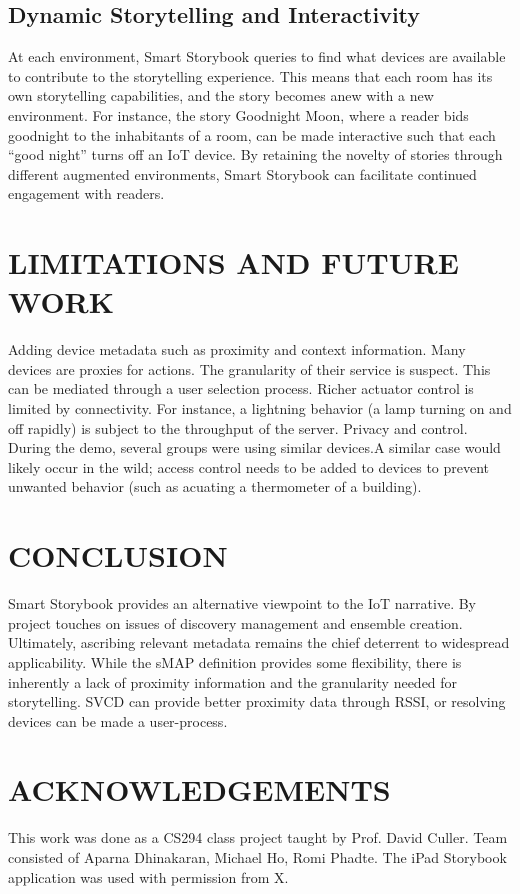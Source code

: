 \documentclass{sigchi}
\begin{document}
\subsection{Dynamic Storytelling and Interactivity}
At each environment, Smart Storybook queries to find what devices are available to contribute to the storytelling experience. This means that each room has its own storytelling capabilities, and the story becomes anew with a new environment. For instance, the story Goodnight Moon, where a reader bids goodnight to the inhabitants of a room, can be made interactive such that each “good night” turns off an IoT device. By retaining the novelty of stories through different augmented environments, Smart Storybook can facilitate continued engagement with readers. 


\section{LIMITATIONS AND FUTURE WORK}
Adding device metadata such as proximity and context information. Many devices are proxies for actions. The granularity of their service is suspect. This can be mediated through a user selection process. 
Richer actuator control is limited by connectivity. For instance, a lightning behavior (a lamp turning on and off rapidly) is subject to the throughput of the server.
Privacy and control. During the demo, several groups were using similar devices.A similar case would likely occur in the wild; access control needs to be added to devices to prevent unwanted behavior (such as acuating a thermometer of a building). 

\section{CONCLUSION}
Smart Storybook provides an alternative viewpoint to the IoT narrative. By project touches on issues of discovery management and ensemble creation. Ultimately, ascribing relevant metadata remains the chief deterrent to widespread applicability. While the sMAP definition provides some flexibility,  there is inherently a lack of proximity information and the granularity needed for storytelling. SVCD can provide better proximity data through RSSI, or resolving devices can be made a user-process.


\section{ACKNOWLEDGEMENTS}
This work was done as a CS294 class project taught by Prof. David Culler. 
Team consisted of Aparna Dhinakaran, Michael Ho, Romi Phadte. 
The iPad Storybook application was used with permission from X. 

\balance


\end{document}
